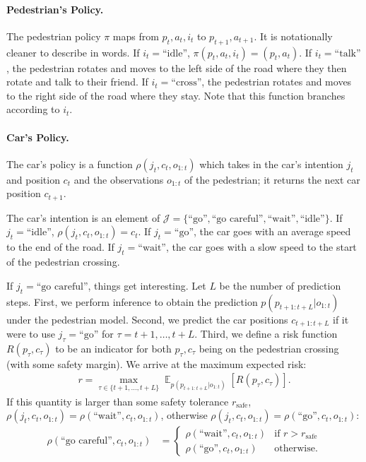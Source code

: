 \documentclass[a4paper]{article}
\newcommand{\given}{\lvert}
\DeclareMathOperator{\E}{\mathbb{E}}
\begin{document}
\paragraph{Pedestrian's Policy.}
The pedestrian policy $\pi$ maps from $p_t, a_t, i_t$ to $p_{t + 1}, a_{t + 1}$.
It is notationally cleaner to describe in words.
If $i_t = \text{``idle''}$, $\pi(p_t, a_t, i_t) = (p_t, a_t)$.
If $i_t = \text{``talk''}$, the pedestrian rotates and moves to the left side of the road where they then rotate and talk to their friend.
If $i_t = \text{``cross''}$, the pedestrian rotates and moves to the right side of the road where they stay.
Note that this function branches according to $i_t$.

\paragraph{Car's Policy.}
The car's policy is a function $\rho(j_t, c_t, o_{1:t})$ which takes in the car's intention $j_t$ and position $c_t$ and the observations $o_{1:t}$ of the pedestrian; it returns the next car position $c_{t + 1}$.

The car's intention is an element of $\mathcal J = \{\text{``go''}, \text{``go careful''}, \text{``wait''}, \text{``idle''}\}$.
If $j_t = \text{``idle''}$, $\rho(j_t, c_t, o_{1:t}) = c_t$.
If $j_t = \text{``go''}$, the car goes with an average speed to the end of the road.
If $j_t = \text{``wait''}$, the car goes with a slow speed to the start of the pedestrian crossing.

If $j_t = \text{``go careful''}$, things get interesting.
Let $L$ be the number of prediction steps.
First, we perform inference to obtain the prediction $p(p_{t + 1:t + L} \given o_{1:t})$ under the pedestrian model.
Second, we predict the car positions $c_{t + 1:t + L}$ if it were to use $j_{\tau} = \text{``go''}$ for $\tau = t + 1, \dotsc, t + L$.
Third, we define a risk function $R(p_{\tau}, c_{\tau})$ to be an indicator for both $p_{\tau}, c_{\tau}$ being on the pedestrian crossing (with some safety margin).
We arrive at the maximum expected risk:
\begin{align}
    r = \max_{\tau \in \{t + 1, \dotsc, t + L\}} \E_{p(p_{t + 1:t + L} \given o_{1:t})}\left[R(p_\tau, c_{\tau})\right]. \label{eq:risk}
\end{align}
If this quantity is larger than some safety tolerance $r_{\text{safe}}$, $\rho(j_t, c_t, o_{1:t}) = \rho(\text{``wait''}, c_t, o_{1:t})$, otherwise $\rho(j_t, c_t, o_{1:t}) = \rho(\text{``go''}, c_t, o_{1:t})$:
\begin{align}
    \rho(\text{``go careful''}, c_t, o_{1:t}) &=
    \begin{cases}
        \rho(\text{``wait''}, c_t, o_{1:t}) & \text{if } r > r_{\text{safe}} \\
        \rho(\text{``go''}, c_t, o_{1:t}) & \text{otherwise}.
    \end{cases}
\end{align}
\end{document}
